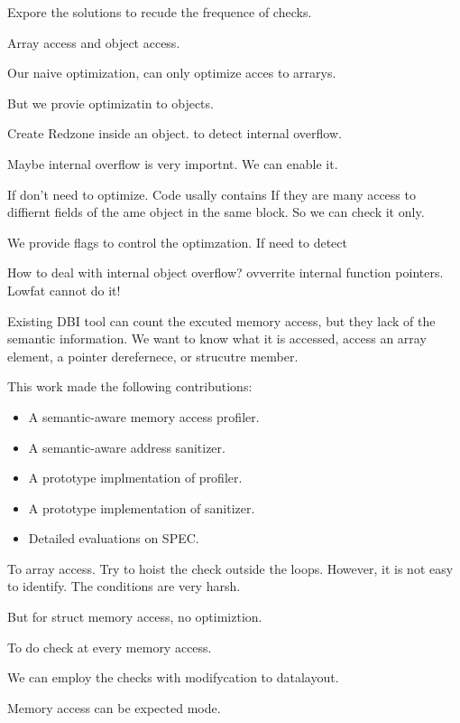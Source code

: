 Expore the solutions to recude the frequence of checks.

Array access and object access.

Our naive optimization, can only optimize acces to arrarys.

But we provie optimizatin to objects.

Create Redzone inside an object. to detect internal overflow.

Maybe internal overflow is very importnt.
We can enable it.



If don't need to optimize.
Code usally contains If they are many access to diffiernt fields of the ame object in the same block.
So we can check it only.


We provide flags to control the optimzation.
If need to detect

How to deal with internal object overflow? ovverrite internal function pointers.
Lowfat cannot do it!


Existing DBI tool can count the excuted memory access, but they lack of the semantic information.
We want to know what it is accessed, access an array element, a pointer derefernece, or strucutre member.


This work made the following contributions:

\begin{itemize}
  \item A semantic-aware memory access profiler.
  \item A semantic-aware address sanitizer.
  \item A prototype implmentation of profiler.
  \item A prototype implementation of sanitizer.
  \item Detailed evaluations on SPEC.
\end{itemize}


To array access.
Try to hoist the check outside the loops.
However, it is not easy to identify.
The conditions are very harsh.

But for struct memory access, no optimiztion.

To do check at every memory access.

We can employ the checks with modifycation to
datalayout.

Memory access can be expected mode.




